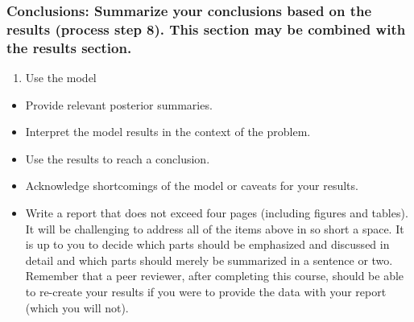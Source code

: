 \documentclass[
]{article}
\providecommand{\tightlist}{%
  \setlength{\itemsep}{0pt}\setlength{\parskip}{0pt}}
\begin{document}
\hypertarget{conclusions-summarize-your-conclusions-based-on-the-results-process-step-8.-this-section-may-be-combined-with-the-results-section.}{%
\subsubsection{Conclusions: Summarize your conclusions based on the
results (process step 8). This section may be combined with the results
section.}\label{conclusions-summarize-your-conclusions-based-on-the-results-process-step-8.-this-section-may-be-combined-with-the-results-section.}}

\begin{enumerate}
\def\labelenumi{\arabic{enumi}.}
\setcounter{enumi}{7}
\tightlist
\item
  Use the model
\end{enumerate}

\begin{itemize}
\tightlist
\item
  Provide relevant posterior summaries.
\item
  Interpret the model results in the context of the problem.
\item
  Use the results to reach a conclusion.
\item
  Acknowledge shortcomings of the model or caveats for your results.
\item
  Write a report that does not exceed four pages (including figures and
  tables). It will be challenging to address all of the items above in
  so short a space. It is up to you to decide which parts should be
  emphasized and discussed in detail and which parts should merely be
  summarized in a sentence or two. Remember that a peer reviewer, after
  completing this course, should be able to re-create your results if
  you were to provide the data with your report (which you will not).
\end{itemize}
\end{document}
